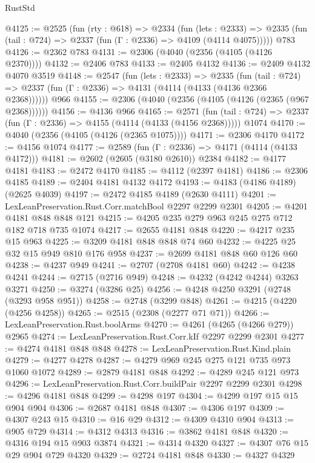 \begin{lexlean}{RustStd}
\begin{coremodule}
@4125 := @2525
    (fun (rty : @618) =>
    @2334
      (fun (lets : @2333) =>
      @2335 (fun (tail : @724) => @2337 (fun (Γ : @2336) => @4109 (@4114 @4075)))))
    @783
@4126 := @2362 @783
@4131 := @2306 (@4040 (@2356 (@4105 (@4126 @2370))))
@4132 := @2406 @783
@4133 := @2405 @4132
@4136 := @2409 @4132 @4070 @3519
@4148 := @2547
    (fun (lets : @2333) =>
    @2335
      (fun (tail : @724) => @2337 (fun (Γ : @2336) => @4131 (@4114 (@4133 (@4136 @2366 @2368))))))
    @966
@4155 := @2306 (@4040 (@2356 (@4105 (@4126 (@2365 (@967 @2368))))))
@4156 := @4136 @966
@4165 := @2571
    (fun (tail : @724) => @2337 (fun (Γ : @2336) => @4155 (@4114 (@4133 (@4156 @2368)))))
    @1074
@4170 := @4040 (@2356 (@4105 (@4126 (@2365 @1075))))
@4171 := @2306 @4170
@4172 := @4156 @1074
@4177 := @2589 (fun (Γ : @2336) => @4171 (@4114 (@4133 @4172)))
@4181 := @2602 (@2605 (@3180 @2610)) @2384
@4182 := @4177 @4181
@4183 := @2472 @4170
@4185 := @4112 (@2397 @4181)
@4186 := @2306 @4185
@4189 := @2404 @4181 @4132 @4172
@4193 := @4183 (@4186 @4189) (@2625 @4039)
@4197 := @2472 @4185 @4189 (@2630 @4111)
@4201 := LexLeanPreservation.Rust.Corr.matchBool @2297 @2299 @2301
@4205 := @4201 @4181 @848 @848 @121
@4215 := @4205 @235 @279 @963 @245 @275 @712 @182 @718 @735 @1074
@4217 := @2655 @4181 @848
@4220 := @4217 @235 @15 @963
@4225 := @3209 @4181 @848 @848 @74 @60
@4232 := @4225 @25 @32 @15 @949 @810 @176 @958
@4237 := @2699 @4181 @848 @60 @126 @60
@4238 := @4237 @949
@4241 := @2707 (@2708 @4181 @60)
@4242 := @4238 @4241
@4244 := @2715 (@2716 @949)
@4248 := @4232 (@4242 @4244) @3263 @3271
@4250 := @3274 (@3286 @25)
@4256 := @4248 @4250 @3291 (@2748 (@3293 @958 @951))
@4258 := @2748 (@3299 @848)
@4261 := @4215 (@4220 (@4256 @4258))
@4265 := @2515 (@2308 (@2277 @71 @71))
@4266 := LexLeanPreservation.Rust.boolArms
@4270 := @4261 (@4265 (@4266 @279)) @2965
@4274 := LexLeanPreservation.Rust.Corr.kIf @2297 @2299 @2301
@4277 := @4274 @4181 @848 @848
@4278 := LexLeanPreservation.Rust.Kind.plain
@4279 := @4277 @4278
@4287 := @4279 @969 @245 @275 @121 @735 @973 @1060 @1072
@4289 := @2879 @4181 @848
@4292 := @4289 @245 @121 @973
@4296 := LexLeanPreservation.Rust.Corr.buildPair @2297 @2299 @2301
@4298 := @4296 @4181 @848
@4299 := @4298 @197
@4304 := @4299 @197 @15 @15 @904 @904
@4306 := @2687 @4181 @848
@4307 := @4306 @197
@4309 := @4307 @243 @15
@4310 := @16 @29
@4312 := @4309 @4310 @904
@4313 := @905 @729
@4314 := @4312 @4313
@4316 := @3862 @4181 @848
@4320 := @4316 @194 @15 @903 @3874
@4321 := @4314 @4320
@4327 := @4307 @76 @15 @29 @904 @729 @4320
@4329 := @2724 @4181 @848
@4330 := @4327 @4329

\end{coremodule}
\end{lexlean}
